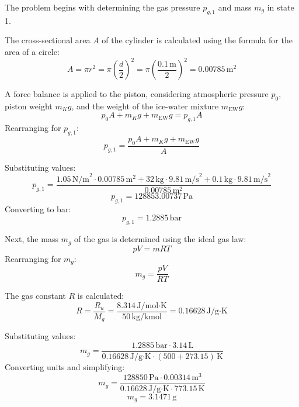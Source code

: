 The problem begins with determining the gas pressure \( p_{g,1} \) and mass \( m_g \) in state 1.  

The cross-sectional area \( A \) of the cylinder is calculated using the formula for the area of a circle:  
\[
A = \pi r^2 = \pi \left(\frac{d}{2}\right)^2 = \pi \left(\frac{0.1 \, \text{m}}{2}\right)^2 = 0.00785 \, \text{m}^2
\]  

A force balance is applied to the piston, considering atmospheric pressure \( p_0 \), piston weight \( m_K g \), and the weight of the ice-water mixture \( m_{\text{EW}} g \):  
\[
p_0 A + m_K g + m_{\text{EW}} g = p_{g,1} A
\]  
Rearranging for \( p_{g,1} \):  
\[
p_{g,1} = \frac{p_0 A + m_K g + m_{\text{EW}} g}{A}
\]  

Substituting values:  
\[
p_{g,1} = \frac{1.05 \, \text{N/m}^2 \cdot 0.00785 \, \text{m}^2 + 32 \, \text{kg} \cdot 9.81 \, \text{m/s}^2 + 0.1 \, \text{kg} \cdot 9.81 \, \text{m/s}^2}{0.00785 \, \text{m}^2}
\]  
\[
p_{g,1} = 128853.00737 \, \text{Pa}
\]  
Converting to bar:  
\[
p_{g,1} = 1.2885 \, \text{bar}
\]  

Next, the mass \( m_g \) of the gas is determined using the ideal gas law:  
\[
p V = m R T
\]  
Rearranging for \( m_g \):  
\[
m_g = \frac{p V}{R T}
\]  

The gas constant \( R \) is calculated:  
\[
R = \frac{R_u}{M_g} = \frac{8.314 \, \text{J/mol·K}}{50 \, \text{kg/kmol}} = 0.16628 \, \text{J/g·K}
\]  

Substituting values:  
\[
m_g = \frac{1.2885 \, \text{bar} \cdot 3.14 \, \text{L}}{0.16628 \, \text{J/g·K} \cdot (500 + 273.15) \, \text{K}}
\]  
Converting units and simplifying:  
\[
m_g = \frac{128850 \, \text{Pa} \cdot 0.00314 \, \text{m}^3}{0.16628 \, \text{J/g·K} \cdot 773.15 \, \text{K}}
\]  
\[
m_g = 3.1471 \, \text{g}
\]